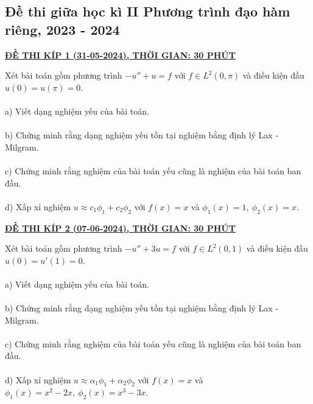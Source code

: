 \documentclass[10.5pt, a4paper]{article}
\begin{document}
\newpage

\subsection{Đề thi giữa học kì II Phương trình đạo hàm riêng, 2023 - 2024}
\begin{center}
	\color{blue}\underline{\textbf{ĐỀ THI KÍP 1 (31-05-2024), THỜI GIAN: 30 PHÚT}}
\end{center}
Xét bài toán gồm phương trình $-u''+u=f$ với $f\in L^2(0,\pi)$ và điều kiện đầu $u(0)=u(\pi)=0$.\\\\
\color{red}a) \color{black}Viết dạng nghiệm yếu của bài toán.\\\\
\color{red}b) \color{black}Chứng minh rằng dạng nghiệm yếu tồn tại nghiệm bằng định lý Lax - Milgram.\\\\
\color{red}c) \color{black}Chứng minh rằng nghiệm của bài toán yếu cũng là nghiệm của bài toán ban đầu.\\\\
\color{red}d) \color{black}Xấp xỉ nghiệm $u\approx c_1\phi_1+c_2\phi_2$ với $f(x)=x$ và $\phi_1(x)=1,~\phi_2(x)=x$.
\begin{center}
	\color{blue}\underline{\textbf{ĐỀ THI KÍP 2 (07-06-2024), THỜI GIAN: 30 PHÚT}}
\end{center}
Xét bài toán gồm phương trình $-u''+3u=f$ với $f\in L^2(0,1)$ và điều kiện đầu $u(0)=u'(1)=0$.\\\\
\color{red}a) \color{black}Viết dạng nghiệm yếu của bài toán.\\\\
\color{red}b) \color{black}Chứng minh rằng dạng nghiệm yếu tồn tại nghiệm bằng định lý Lax - Milgram.\\\\
\color{red}c) \color{black}Chứng minh rằng nghiệm của bài toán yếu cũng là nghiệm của bài toán ban đầu.\\\\
\color{red}d) \color{black}Xấp xỉ nghiệm $u\approx \alpha_1\phi_1+\alpha_2\phi_2$ với $f(x)=x$ và $\phi_1(x)=x^2-2x,~\phi_2(x)=x^3-3x$.

\newpage
\end{document}
